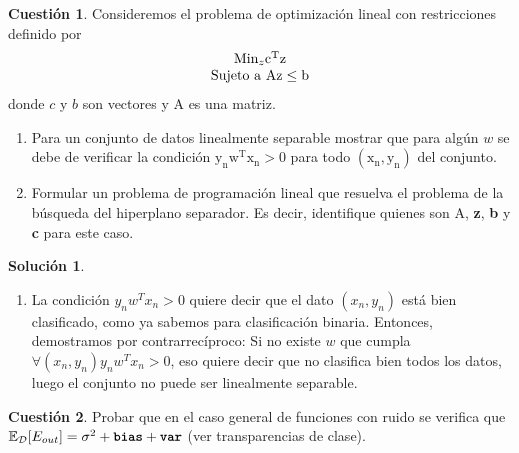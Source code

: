\documentclass[a4paper, 11pt]{article}
\theoremstyle{definition}
\newtheorem{cuestion}{Cuestión}
\newtheorem*{solucion}{Solución}
\begin{document}
  \begin{cuestion}
    Consideremos el problema de optimización lineal con restricciones definido por
    \[
    \begin{array}{c}
    \text{Min}_{z} \mathrm{c^Tz} \\
    \hbox{Sujeto a } \mathrm{Az \leq b}
    \end{array}
    \]
    donde $c$ y $b$ son vectores y A es una matriz.

         \begin{enumerate}
            \item Para un conjunto de datos linealmente separable mostrar que para algún $w$ se debe de verificar la condición  $\mathrm{y_nw^Tx_n>0 }$ para todo $\mathrm{(x_n,y_n)}$ del conjunto.
            \item Formular un problema de programación lineal que resuelva el problema de la búsqueda del hiperplano separador. Es decir, identifique quienes son A, \textbf{z}, \textbf{b} y \textbf{c} para este caso.
        \end{enumerate}
  \end{cuestion}

  \begin{solucion}
    \begin{enumerate}
      \item La condición $y_nw^Tx_n>0$ quiere decir que el dato $(x_n,y_n)$ está bien clasificado, como ya sabemos para clasificación binaria. Entonces, demostramos por contrarrecíproco: Si no existe $w$ que cumpla $\forall (x_n,y_n) y_nw^Tx_n>0$, eso quiere decir que no clasifica bien todos los datos, luego el conjunto no puede ser linealmente separable.
    \end{enumerate}
  \end{solucion}

  \begin{cuestion}
    Probar que en el caso general de funciones con ruido se verifica que $\mathbb{E}_{\mathcal{D}}[E_{out}]= \sigma^2+\texttt{\textbf{bias}}+\texttt{\textbf{var}}$ (ver transparencias de clase).

  \end{cuestion}
\end{document}
